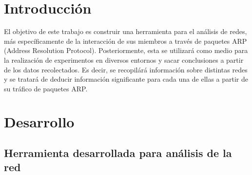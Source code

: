 
\lstset{escapechar=@,style=customc}




\fecha{\today}

\grupo{}


\maketitle

\tableofcontents
\newpage

\section{Introducción}
El objetivo de este trabajo es construir una herramienta para el análisis de redes, más específicamente de la interacción de sus miembros a través de paquetes ARP (Address Resolution Protocol). Posteriormente, esta se utilizará como medio para la realización de experimentos en diversos entornos y sacar conclusiones a partir de los datos recolectados. Es decir, se recopilárá información sobre distintas redes y se tratará de deducir información significante para cada una de ellas a partir de su tráfico de paquetes ARP.

\section{Desarrollo}
\subsection{Herramienta desarrollada para análisis de la red}
